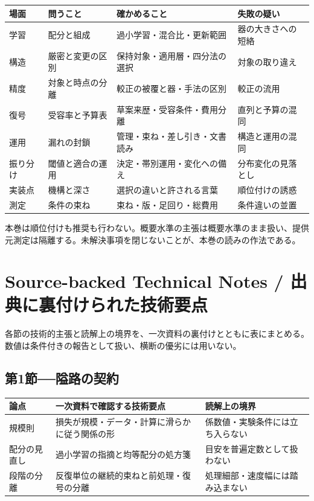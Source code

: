 \documentclass[lualatex,a4paper,10pt]{jlreq}
\begin{document}
\begin{center}
\small
\begin{tabularx}{\textwidth}{@{}p{}p{}p{}X@{}}
\toprule
場面 & 問うこと & 確かめること & 失敗の疑い \\
\midrule
学習 & 配分と組成 & 過小学習・混合比・更新範囲 & 器の大きさへの短絡 \\
構造 & 厳密と変更の区別 & 保持対象・適用層・四分法の選択 & 対象の取り違え \\
精度 & 対象と時点の分離 & 較正の被覆と器・手法の区別 & 較正の流用 \\
復号 & 受容率と予算表 & 草案来歴・受容条件・費用分離 & 直列と予算の混同 \\
運用 & 漏れの封鎖 & 管理・束ね・差し引き・文書読み & 構造と運用の混同 \\
振り分け & 閾値と適合の運用 & 決定・帯別運用・変化への備え & 分布変化の見落とし \\
実装点 & 機構と深さ & 選択の違いと許される言葉 & 順位付けの誘惑 \\
測定 & 条件の束ね & 束ね・版・足回り・総費用 & 条件違いの並置 \\
\bottomrule
\end{tabularx}
\end{center}
\autocite{kaplan2020,chinchilla,orca,shazeer2017,flashattn,engram,gptq,gguf,specdecode,snell2024,pagedattn,splitwise,frugalgpt,sysone,v41report,qwen38next,kimigithub,glm5report,swebench,mlperf}

\begin{claimboundary}[本巻の読解上の境界]
本巻は順位付けも推奨も行わない。概要水準の主張は概要水準のまま扱い、提供元測定は隔離する。未解決事項を閉じないことが、本巻の読みの作法である。
\end{claimboundary}

\section*{Source-backed Technical Notes / 出典に裏付けられた技術要点}
\small
各節の技術的主張と読解上の境界を、一次資料の裏付けとともに表にまとめる。数値は条件付きの報告として扱い、横断の優劣には用いない。

\subsection*{第1節──隘路の契約}
\begin{tabularx}{\textwidth}{@{}>{\raggedright\arraybackslash}p{}>{\raggedright\arraybackslash}p{}>{\raggedright\arraybackslash}X@{}}
\toprule
論点 & 一次資料で確認する技術要点 & 読解上の境界 \\
\midrule
規模則 & 損失が規模・データ・計算に滑らかに従う関係の形 & 係数値・実験条件には立ち入らない \\
配分の見直し & 過小学習の指摘と均等配分の処方箋 & 目安を普遍定数として扱わない \\
段階の分離 & 反復単位の継続的束ねと前処理・復号の分離 & 処理細部・速度幅には踏み込まない \\
\bottomrule
\end{tabularx}
\autocite{kaplan2020,chinchilla,orca}
\end{document}
